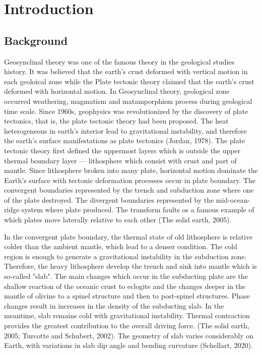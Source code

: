 
\chapter{Introduction}

\section{Background}

Geosynclinal theory was one of the famous theory in the geological studies history. It was believed that the earth's crust deformed with vertical motion in each geoloical zone while the Plate tectonic theory claimed that the earth's crust deformed with horizontal motion. In Geosynclinal theory, geological zone occurred weathering, magmatism and matamporphism process during geological time scale. Since 1960s, geophysics was revolutionized by the discovery of plate tectonics, that is, the plate tectonic theory had been proposed. The heat heterogeneous in earth's interior lead to gravitational instability, and therefore the earth's surface manifestations as plate tectonics (Jordan, 1978). The plate tectonic theory first defined the uppermost layers which is outside the upper thermal boundary layer --- lithosphere which consist with crust and part of mantle. Since lithosphere broken into many plate, horizontal motion dominate the Earth's surface with tectonic deformation processes  occur in plate boundary. The convergent boundaries represented by the trench and subduction zone where one of the plate destroyed. The divergent boundaries represented by the mid-ocean-ridge system where plate produced. The transform faults os a famous example of which plates move laterally relative to each other (The solid earth, 2005). 

In the convergent plate boundary, the thermal state of old lithosphere is relative colder than the ambient mantle, which lead to a denser condition. The cold region is enough to generate a gravitational instability in the subduction zone. Therefore, the heavy lithosphere develop the trench and sink into mantle which is so-called "slab".  The main changes which occur in the subducting plate are the shallow reaction of the oceanic crust to eclogite and the changes deeper in the mantle of olivine to a spinel structure and then to post-spinel structures. Phase changes result in increases in the density of the subducting slab. In the meantime, slab remains cold with gravitational instability. Thermal contraction provides the greatest contribution to the overall driving force. (The solid earth, 2005; Turcotte and Schubert, 2002). The geometry of slab varies considerably on Earth, with variations in slab dip angle and bending curvature (Schellart, 2020).

